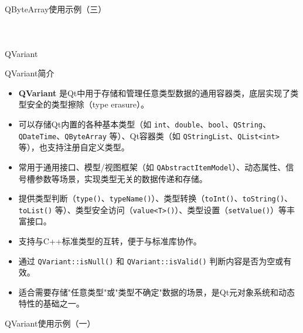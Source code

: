 \documentclass[UTF8,aspectratio=169]{beamer}
\begin{document}
\begin{frame}[fragile]{QByteArray使用示例（三）}
    \begin{columns}
        \begin{column}{0.48\textwidth}
            \inputminted[firstline=69,lastline=85]{cpp}{code/qt_bytearray_example.cpp}
        \end{column}
        \begin{column}{0.48\textwidth}
            \inputminted[firstline=86,lastline=95]{cpp}{code/qt_bytearray_example.cpp}
        \end{column}
    \end{columns}
\end{frame}

\begin{frame}{QVariant}
    \begin{ytublock}{QVariant简介}
        \begin{itemize}
            \item \textbf{QVariant} 是Qt中用于存储和管理任意类型数据的通用容器类，底层实现了类型安全的类型擦除（type erasure）。
            \item 可以存储Qt内置的各种基本类型（如 \texttt{int}、\texttt{double}、\texttt{bool}、\texttt{QString}、\texttt{QDateTime}、\texttt{QByteArray} 等）、Qt容器类（如 \texttt{QStringList}、\texttt{QList<int>} 等），也支持注册自定义类型。
            \item 常用于通用接口、模型/视图框架（如 \texttt{QAbstractItemModel}）、动态属性、信号槽参数等场景，实现类型无关的数据传递和存储。
            \item 提供类型判断（\texttt{type()}、\texttt{typeName()}）、类型转换（\texttt{toInt()}、\texttt{toString()}、\texttt{toList()} 等）、类型安全访问（\texttt{value<T>()}）、类型设置（\texttt{setValue()}）等丰富接口。
            \item 支持与C++标准类型的互转，便于与标准库协作。
            \item 通过 \texttt{QVariant::isNull()} 和 \texttt{QVariant::isValid()} 判断内容是否为空或有效。
            \item 适合需要存储"任意类型"或"类型不确定"数据的场景，是Qt元对象系统和动态特性的基础之一。
        \end{itemize}
    \end{ytublock}
\end{frame}

\begin{frame}[fragile]{QVariant使用示例（一）}
    \begin{columns}
        \begin{column}{0.48\textwidth}
            \inputminted[firstline=1,lastline=16]{cpp}{code/qt_variant_example.cpp}
        \end{column}
        \begin{column}{0.48\textwidth}
            \inputminted[firstline=18,lastline=30]{cpp}{code/qt_variant_example.cpp}
        \end{column}
    \end{columns}
\end{frame}
\end{document}
